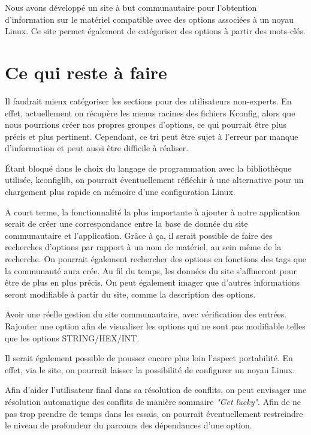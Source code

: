 \documentclass[16pts]{report}
\begin{document}
    Nous avons développé un site à but communautaire pour l'obtention
    d'information sur le matériel compatible avec des options associées à un
    noyau Linux. Ce site permet également de catégoriser des options à partir
    des mots-clés.

    \section{Ce qui reste à faire}
    \label{sec:Ce qui reste à faire}
    Il faudrait mieux catégoriser les sections pour des utilisateurs
    non-experts.  En effet, actuellement on récupère les menus racines des
    fichiers Kconfig, alors que nous pourrions créer nos propres groupes
    d'options, ce qui pourrait être plus précis et plus pertinent. Cependant,
    ce tri peut être sujet à l'erreur par manque d'information et peut aussi
    être difficile à réaliser.


    Étant bloqué dans le choix du langage de programmation avec la bibliothèque
    utilisée, kconfiglib, on pourrait éventuellement réfléchir à une
    alternative pour un chargement plus rapide en mémoire d'une configuration
    Linux.

    A court terme, la fonctionnalité la plus importante à ajouter à notre
    application serait de créer une correspondance entre la base de donnée du
    site communautaire et l'application. Grâce à ça, il serait possible de
    faire des recherches d'options par rapport à un nom de matériel, au sein
    même de la recherche. On pourrait également rechercher des options en
    fonctions des tags que la communauté aura crée. Au fil du temps, les
    données du site s'affineront pour être de plus en plus précis. On peut
    également imager que d'autres informations seront modifiable à partir du
    site, comme la description des options.

    Avoir une réelle gestion du site communautaire, avec vérification des
    entrées.  Rajouter une option afin de visualiser les options qui ne sont
    pas modifiable telles que les options STRING/HEX/INT.

    Il serait également possible de pousser encore plus loin l'aspect
    portabilité.  En effet, via le site, on pourrait laisser la possibilité de
    configurer un noyau Linux.

    Afin d'aider l'utilisateur final dans sa résolution de conflits, on peut
    envisager une résolution automatique des conflits de manière sommaire
    \textit{"Get lucky"}.  Afin de ne pas trop prendre de temps dans les
    essais, on pourrait éventuellement restreindre le niveau de profondeur du
    parcours des dépendances d'une option.
\end{document}

